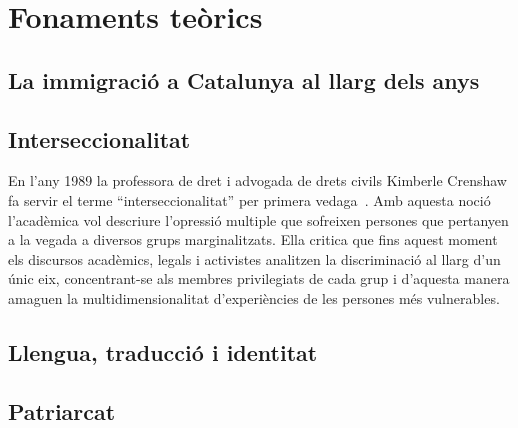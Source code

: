 \section{Fonaments teòrics}

\subsection{La immigració a Catalunya al llarg dels anys}

\subsection{Interseccionalitat}
En l'any 1989 la professora de dret i advogada de drets civils Kimberle Crenshaw fa servir el terme ``interseccionalitat'' per primera vedaga~\autocite{Crenshaw1989}.
Amb aquesta noció l'acadèmica vol descriure l'opressió multiple que sofreixen persones que pertanyen a la vegada a diversos grups marginalitzats.
Ella critica que fins aquest moment els discursos acadèmics, legals i activistes analitzen la discriminació al llarg d'un únic eix, concentrant-se als membres privilegiats de cada grup i d'aquesta manera amaguen la multidimensionalitat d'experiències de les persones més vulnerables.

\subsection{Llengua, traducció i identitat}

\subsection{Patriarcat}

\begin{comment}
2) Basics
   ** la immigració a Catalunya
   ** interseccionalitat -- Crenshaw
   ** llengua?
   ** identitat?
   ** Laurie Penny (chapter 2)
\end{comment}
